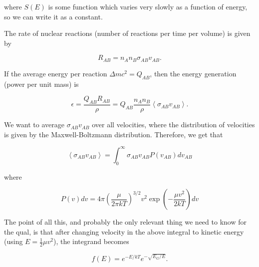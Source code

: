 \noindent where $S(E)$ is some function which varies very slowly as a function of energy, so we can write it as a constant.

The rate of nuclear reactions (number of reactions per time per volume) is given by 

\begin{equation}
R_{AB} = n_{A} n_{B} \sigma_{AB} v_{AB}.
\end{equation}

If the average energy per reaction $\Delta mc^2 = Q_{AB}$, then the energy generation (power per unit mass) is 

\begin{equation}\label{engen}
\epsilon = \frac{Q_{AB} R_{AB}}{\rho} = Q_{AB} \frac{n_{A} n_{B}}{\rho} \left<\sigma_{AB} v_{AB}\right>.
\end{equation}

We want to average $\sigma_{AB} v_{AB}$ over all velocities, where the distribution of velocities is given by the Maxwell-Boltzmann distribution.  Therefore, we get that

\begin{equation}
\left< \sigma_{AB} v_{AB} \right> = \int_0^{\infty} \sigma_{AB} v_{AB} P(v_{AB}) dv_{AB}
\end{equation}

where

\begin{equation}
P(v)dv = 4 \pi \left( \frac{\mu}{2 \pi kT} \right)^{3/2} v^2 \exp\left(- \frac{\mu v^2}{2kT}\right) dv
\end{equation}

The point of all this, and probably the only relevant thing we need to know for the qual, is that after changing velocity in the above integral to kinetic energy (using $E = \frac{1}{2} \mu v^2$), the integrand becomes

\begin{equation}\label{gamp}
f(E) = e^{-E/kT} e^{-\sqrt{E_{G}/E}}.
\end{equation}

